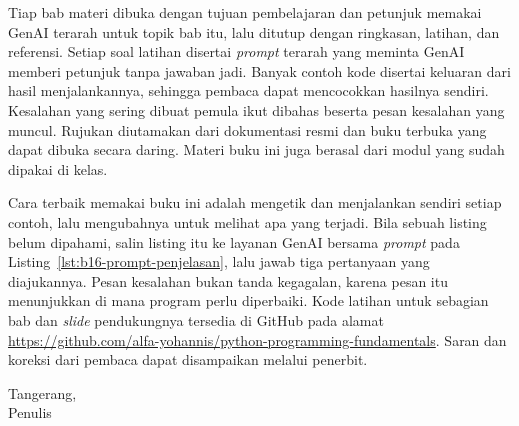 Tiap bab materi dibuka dengan tujuan pembelajaran dan petunjuk memakai GenAI terarah untuk topik bab itu, lalu ditutup dengan ringkasan, latihan, dan referensi. Setiap soal latihan disertai \textit{prompt} terarah yang meminta GenAI memberi petunjuk tanpa jawaban jadi. Banyak contoh kode disertai keluaran dari hasil menjalankannya, sehingga pembaca dapat mencocokkan hasilnya sendiri. Kesalahan yang sering dibuat pemula ikut dibahas beserta pesan kesalahan yang muncul. Rujukan diutamakan dari dokumentasi resmi dan buku terbuka yang dapat dibuka secara daring. Materi buku ini juga berasal dari modul yang sudah dipakai di kelas.

Cara terbaik memakai buku ini adalah mengetik dan menjalankan sendiri setiap contoh, lalu mengubahnya untuk melihat apa yang terjadi. Bila sebuah listing belum dipahami, salin listing itu ke layanan GenAI bersama \textit{prompt} pada Listing~\ref{lst:b16-prompt-penjelasan}, lalu jawab tiga pertanyaan yang diajukannya. Pesan kesalahan bukan tanda kegagalan, karena pesan itu menunjukkan di mana program perlu diperbaiki. Kode latihan untuk sebagian bab dan \textit{slide} pendukungnya tersedia di GitHub pada alamat \url{https://github.com/alfa-yohannis/python-programming-fundamentals}. Saran dan koreksi dari pembaca dapat disampaikan melalui penerbit.

\bigskip
\begin{flushright}
Tangerang, \\[4pt]
Penulis
\end{flushright}

